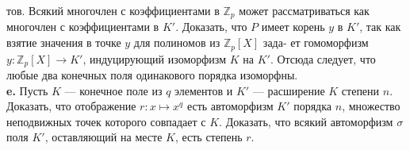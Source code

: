 тов. Всякий многочлен с коэффициентами в $\mathbb{Z}_p$ может рассматриваться\linebreak
как многочлен с коэффициентами в $K'$. Доказать, что $P$ имеет корень\linebreak
$y$ в $K'$, так как взятие значения в точке $y$ для полиномов из $\mathbb{Z}_p[X]$ зада-\linebreak
ет гомоморфизм $y:\mathbb{Z}_p[X]\rightarrow K'$, индуцирующий изоморфизм $K$ на $K'$.\linebreak
Отсюда следует, что любые два конечных поля одинакового порядка\linebreak
изоморфны.
\\
\hspace*{10pt}\textbf{e.} Пусть $K$ — конечное поле из $q$ элементов и $K'$ — расширение $K$\linebreak
степени $n$. Доказать, что отображение $r:x\mapsto x^q$ есть автоморфизм\linebreak
$K'$ порядка $n$, множество неподвижных точек которого совпадает с $K$.\linebreak
Доказать, что всякий автоморфизм $\sigma$ поля $K'$, оставляющий на месте\linebreak
$K$, есть степень $r$.
\pagebreak


